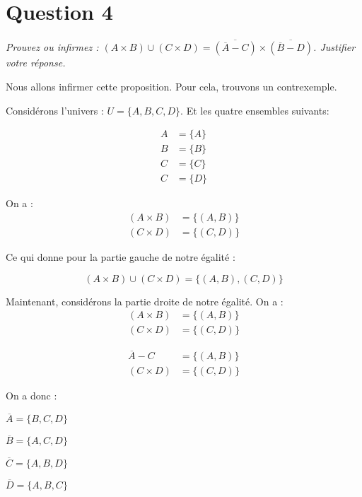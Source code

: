 \section*{Question 4}

\emph{Prouvez ou infirmez : \((A \times B) \cup (C \times D) = \overline{(\overline{A} - C)} \times  \overline{(\overline{B} - D)} \). Justifier votre réponse.}

\bigskip
Nous allons infirmer cette proposition. Pour cela, trouvons un contrexemple.

\medskip
Considérons l’univers : \(U = \{A, B, C, D\}\). Et les quatre ensembles suivants:

\begin{align*}
	A & = \{A\} \\
	B & = \{B\} \\
	C & = \{C\} \\
	C & = \{D\}
\end{align*}

\medskip
On a :
\begin{align*}
	(A \times B) & = \{(A, B)\} \\
	(C \times D) & = \{(C, D)\}
\end{align*}



\medskip
Ce qui donne pour la partie gauche de notre égalité :

\[(A \times B) \cup (C \times D) = \{(A, B), (C, D)\}\]

\smallskip
Maintenant, considérons la partie droite de notre égalité. On a : 
\begin{align*}
	(A \times B) & = \{(A, B)\} \\
	(C \times D) & = \{(C, D)\}
\end{align*}


\begin{align*}
	\overline{A} -C & = \{(A, B)\} \\
	(C \times D) & = \{(C, D)\}
\end{align*}


\smallskip
On a donc :

\(\overline{A} = \{B, C, D\}\)

\(\overline{B} = \{A, C, D\}\)

\(\overline{C} = \{A, B, D\}\)

\(\overline{D} = \{A, B, C\}\)
